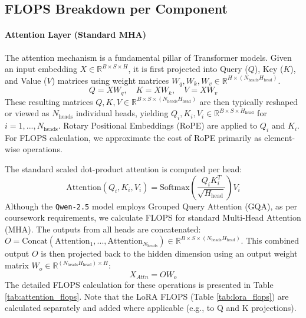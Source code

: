 \documentclass{article}
\begin{document}
\subsection{FLOPS Breakdown per Component}

\paragraph{Attention Layer (Standard MHA)}
The attention mechanism is a fundamental pillar of Transformer models. Given an input embedding $X \in \mathbb{R}^{B \times S \times H}$, it is first projected into Query ($Q$), Key ($K$), and Value ($V$) matrices using weight matrices $W_q, W_k, W_v \in \mathbb{R}^{H \times (N_{\text{heads}}H_{\text{head}})}$. 
\begin{equation}
    Q = X W_q, \quad K = X W_k, \quad V = X W_v 
\end{equation}
These resulting matrices $Q, K, V \in \mathbb{R}^{B \times S \times (N_{\text{heads}}H_{\text{head}})}$ are then typically reshaped or viewed as $N_{\text{heads}}$ individual heads, yielding $Q_i, K_i, V_i \in \mathbb{R}^{B \times S \times H_{\text{head}}}$ for $i=1, ..., N_{\text{heads}}$. Rotary Positional Embeddings (RoPE) \cite{su2023roformerenhancedtransformerrotary} are applied to $Q_i$ and $K_i$. For FLOPS calculation, we approximate the cost of RoPE primarily as element-wise operations.

The standard scaled dot-product attention is computed per head:
\begin{equation}
    \text{Attention}(Q_i, K_i, V_i) = \text{Softmax}\left(\frac{Q_i K_i^T}{\sqrt{H_{\text{head}}}}\right) V_i
\end{equation}
Although the \texttt{Qwen-2.5} model employs Grouped Query Attention (GQA), as per coursework requirements, we calculate FLOPS for standard Multi-Head Attention (MHA). The outputs from all heads are concatenated: $O = \text{Concat}(\text{Attention}_1, ..., \text{Attention}_{N_{\text{heads}}}) \in \mathbb{R}^{B \times S \times (N_{\text{heads}}H_{\text{head}})}$. This combined output $O$ is then projected back to the hidden dimension using an output weight matrix $W_o \in \mathbb{R}^{(N_{\text{heads}}H_{\text{head}}) \times H}$:
\begin{equation}
    X_{Attn} = O W_o
\end{equation}
The detailed FLOPS calculation for these operations is presented in Table \ref{tab:attention_flops}. Note that the LoRA FLOPS (Table \ref{tab:lora_flops}) are calculated separately and added where applicable (e.g., to Q and K projections).
\end{document}
